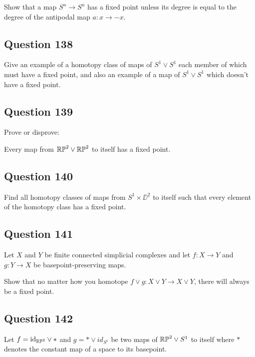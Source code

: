 \documentclass[12pt]{article}
\begin{document}
Show that a map \(S^n \to S^n\) has a fixed point unless its degree is
equal to the degree of the antipodal map \(a : x \to -x\).

\hypertarget{question-138-1}{%
\subsection{Question 138}\label{question-138-1}}

Give an example of a homotopy class of maps of \(S^1 \lor S^1\) each
member of which must have a fixed point, and also an example of a map of
\(S^1 \lor S^1\) which doesn't have a fixed point.

\hypertarget{question-139-1}{%
\subsection{Question 139}\label{question-139-1}}

Prove or disprove:

Every map from \({\mathbb{RP}}^2 \lor {\mathbb{RP}}^2\) to itself has a fixed point.

\hypertarget{question-140-1}{%
\subsection{Question 140}\label{question-140-1}}

Find all homotopy classes of maps from \(S^1 \times \DD^2\) to itself
such that every element of the homotopy class has a fixed point.

\hypertarget{question-141}{%
\subsection{Question 141}\label{question-141}}

Let \(X\) and \(Y\) be finite connected simplicial complexes and let
\(f : X \to Y\) and \(g : Y \to X\) be basepoint-preserving maps.

Show that no matter how you homotope
\(f \lor g : X \lor Y \to X \lor Y\), there will always be a fixed
point.

\hypertarget{question-142}{%
\subsection{Question 142}\label{question-142}}

Let \(f = \text{id}_{{\mathbb{RP}}^2} \lor \ast\) and \(g = \ast \lor id_{S^1}\) be two
maps of \({\mathbb{RP}}^2 \lor S^1\) to itself where \(\ast\) denotes the constant
map of a space to its basepoint.
\end{document}
